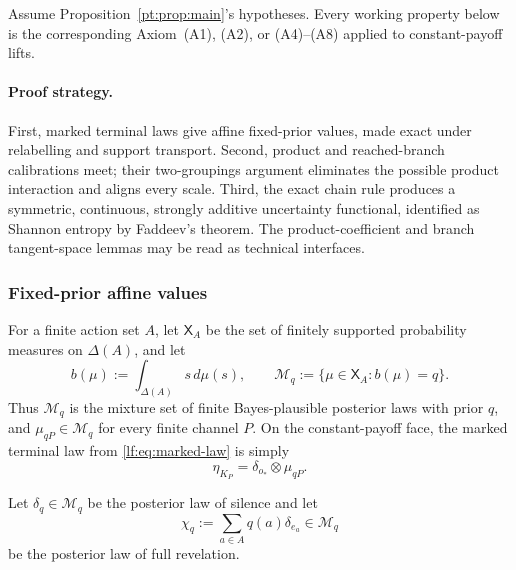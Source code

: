 Assume Proposition~\ref{pt:prop:main}'s hypotheses.  Every working property
below is the corresponding Axiom~\textup{(A1)}, \textup{(A2)}, or
\textup{(A4)--(A8)} applied to constant-payoff lifts.

\paragraph{Proof strategy.}
First, marked terminal laws give affine fixed-prior values, made exact under
relabelling and support transport.  Second, product and reached-branch
calibrations meet; their two-groupings argument eliminates the possible
product interaction and aligns every scale.  Third, the exact chain rule
produces a symmetric, continuous, strongly additive uncertainty functional,
identified as Shannon entropy by Faddeev's theorem.  The product-coefficient
and branch tangent-space lemmas may be read as technical interfaces.

\subsubsection{Fixed-prior affine values}

For a finite action set $A$, let $\mathsf X_A$ be the set of finitely
supported probability measures on $\Delta(A)$, and let
\[
 b(\mu):=\int_{\Delta(A)}s\,d\mu(s),
 \qquad
 \mathcal M_q:=\{\mu\in\mathsf X_A:b(\mu)=q\}.
\]
Thus $\mathcal M_q$ is the mixture set of finite Bayes-plausible posterior
laws with prior $q$, and $\mu_{qP}\in\mathcal M_q$ for every finite channel
$P$.  On the constant-payoff face, the marked terminal law from
\eqref{lf:eq:marked-law} is simply
\begin{equation}
 \eta_{K_P}=\delta_{o_\ast}\otimes\mu_{qP}.
 \label{pt:eq:pure-marked-law}
\end{equation}

Let $\delta_q\in\mathcal M_q$ be the posterior law of silence and let
\[
 \chi_q:=\sum_{a\in A}q(a)\delta_{e_a}\in\mathcal M_q
\]
be the posterior law of full revelation.

